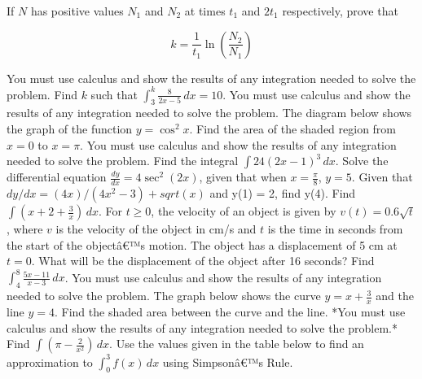 \documentclass[12pt,addpoints]{exam}
\begin{document}
\begin{questions}
If \( N \) has positive values \( N_1 \) and \( N_2 \) at times \( t_1 \) and \( 2t_1 \) respectively, prove that

\[
k = \frac{1}{t_1} \ln \left( \frac{N_2}{N_1} \right)
\]

You must use calculus and show the results of any integration needed to solve the problem.
\fillwithlines{3cm}
\question[5] Find \( k \) such that \(\int_{3}^{k} \frac{8}{2x-5} \, dx = 10\). You must use calculus and show the results of any integration needed to solve the problem.
\fillwithlines{3cm}
\question[5] The diagram below shows the graph of the function \( y = \cos^2 x \). Find the area of the shaded region from \( x = 0 \) to \( x = \pi \). You must use calculus and show the results of any integration needed to solve the problem.
\fillwithlines{3cm}
\question[5] Find the integral \(\int 24(2x-1)^3 \, dx\).
\fillwithlines{3cm}
\question[5] Solve the differential equation \( \frac{dy}{dx} = 4 \sec^2(2x) \), given that when \( x = \frac{\pi}{8} \), \( y = 5 \).
\fillwithlines{3cm}
\question[5] Given that \(dy/dx = (4x)/(4x^2 - 3) + sqrt(x)\) and y(1) = 2, find y(4).
\fillwithlines{3cm}
\question[5] Find \(\int \left( x + 2 + \frac{3}{x} \right) \, dx\).
\fillwithlines{3cm}
\question[5] For \(t \geq 0\), the velocity of an object is given by \(v(t) = 0.6 \sqrt{t}\), where \(v\) is the velocity of the object in cm/s and \(t\) is the time in seconds from the start of the objectâ€™s motion. The object has a displacement of 5 cm at \(t = 0\). What will be the displacement of the object after 16 seconds?
\fillwithlines{3cm}
\question[5] Find \(\int_{4}^{8} \frac{5x - 11}{x - 3} \, dx\). You must use calculus and show the results of any integration needed to solve the problem.
\fillwithlines{3cm}
\question[5] The graph below shows the curve \( y = x + \frac{3}{x} \) and the line \( y = 4 \). Find the shaded area between the curve and the line. *You must use calculus and show the results of any integration needed to solve the problem.*
\fillwithlines{3cm}
\question[5] Find \(\int \left( \pi - \frac{2}{x^2} \right) \, dx\).
\fillwithlines{3cm}
\question[5] Use the values given in the table below to find an approximation to \(\int_0^3 f(x) \, dx\) using Simpsonâ€™s Rule.


\end{questions}
\end{document}
